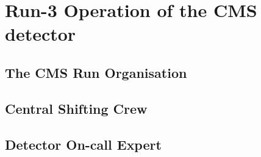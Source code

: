 \chapter{Run-3 Operation of the CMS detector}
\label{chap:Ops}

\section{The CMS Run Organisation}

\section{Central Shifting Crew}

\section{Detector On-call Expert}